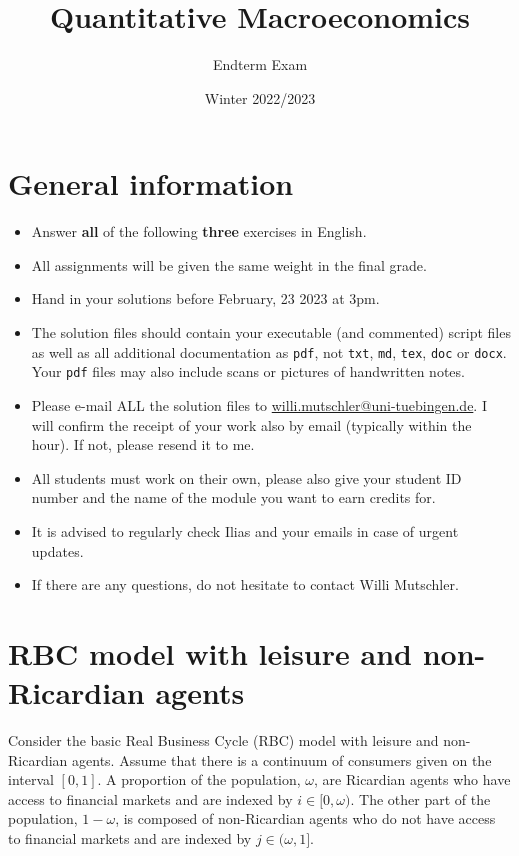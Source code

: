 \documentclass{article}
\begin{document}
	
\title{Quantitative Macroeconomics}
\author{Endterm Exam}
\date{Winter 2022/2023}
\maketitle

\section*{General information}
\begin{itemize}
	\item Answer \textbf{all} of the following \textbf{three} exercises in English.
	\item All assignments will be given the same weight in the final grade.
	\item Hand in your solutions before February, 23 2023 at 3pm.
	\item The solution files should contain your executable (and commented) script files
		as well as all additional documentation as \texttt{pdf}, not \texttt{txt}, \texttt{md}, \texttt{tex}, \texttt{doc} or \texttt{docx}.
	Your \texttt{pdf} files may also include scans or pictures of handwritten notes.
	\item Please e-mail ALL the solution files to \url{willi.mutschler@uni-tuebingen.de}.
	I will confirm the receipt of your work also by email (typically within the hour). If not, please resend it to me.
	\item All students must work on their own, please also give your student ID number and the name of the module you want to earn credits for.
	\item It is advised to regularly check Ilias and your emails in case of urgent updates.
	\item If there are any questions, do not hesitate to contact Willi Mutschler.
\end{itemize}

\newpage


\section{RBC model with leisure and non-Ricardian agents}
Consider the basic Real Business Cycle (RBC) model with leisure and non-Ricardian agents. Assume that there is a continuum of consumers given on the interval $[0,1]$. A proportion of the population, $\omega$, are Ricardian agents who have access to financial markets and are indexed by $i \in [0,\omega)$. The other part of the population, $1-\omega$, is composed of non-Ricardian agents who do not have access to financial markets and are indexed by $j \in (\omega,1]$.
\end{document}
